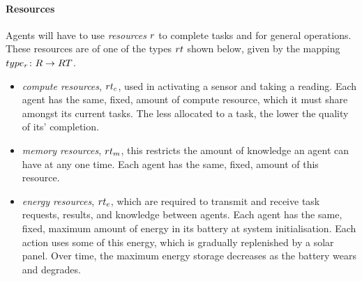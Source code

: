 
\paragraph{Resources}
\label{section:overview:resources}

\newcommand{\varResourceType}[2]{\varSymbol{RT}{#1}{#2}}
\newcommand{\setResourceType}[2]{\setSymbol{RT}{#1}{#2}}
\newcommand{\varResourceTypeCompute}[2]{\varResourceType{c}{#2}}
\newcommand{\varResourceTypeEnergy}[2]{\varResourceType{e}{#2}}
\newcommand{\varResourceTypeMemory}[2]{\varResourceType{m}{#2}}
\newcommand{\varResourceCompute}[2]{\varResource{c}{#2}}
\newcommand{\varResourceEnergy}[2]{\varResource{e}{#2}}
\newcommand{\varResourceMemory}[2]{\varResource{m}{#2}}

\newcommand{\formalResourceType}[2]{
	\functionFormal{type_r}
	{\setResource{}{}}
	{\setResourceType{}{}}
}
\newcommand{\functionResourceType}[2]{
	\functionSignature{type_r}
	{\varResource{}{}}}
Agents will have to use \textit{resources} $\varResource{}{}$ to complete tasks and for general operations. These resources are of one of the types $\varResourceType{}{}$ shown below, given by the mapping $\formalResourceType{}{}$.

\begin{itemize}
	\item \textit{compute resources}, $\varResourceTypeCompute{}{}$, used in activating a sensor and taking a reading. Each agent has the same, fixed, amount of compute resource, which it must share amongst its current tasks. The less allocated to a task, the lower the quality of its' completion. 
	\item \textit{memory resources}, $\varResourceTypeMemory{}{}$,  this restricts the amount of knowledge an agent can have at any one time. Each agent has the same, fixed, amount of this resource.
	\item \textit{energy resources}, $\varResourceTypeEnergy{}{}$,  which are required to transmit and receive task requests, results, and knowledge between agents. Each agent has the same, fixed, maximum amount of energy in its battery at system initialisation. Each action uses some of this energy, which is gradually replenished by a solar panel. Over time, the maximum energy storage decreases as the battery wears and degrades.
\end{itemize}

